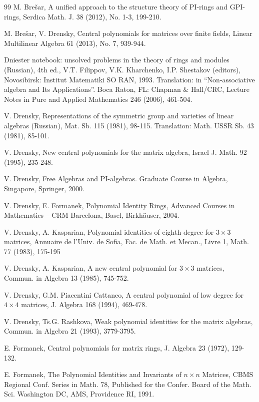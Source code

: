 \documentclass[12pt]{amsart}
\theoremstyle{definition}
\begin{document}
\begin{thebibliography}{99}
 M. Bre\v{s}ar,
A unified approach to the structure theory of PI-rings and GPI-rings,
Serdica Math. J. 38 (2012), No. 1-3, 199-210.

M. Bre\v{s}ar, V. Drensky,
Central polynomials for matrices over finite fields,
Linear Multilinear Algebra 61 (2013), No. 7, 939-944.

Dniester notebook: unsolved problems in the theory of rings and modules (Russian), 4th ed.,
V.T. Filippov, V.K. Kharchenko, I.P. Shestakov (editors), Novosibirsk: Institut Matematiki SO RAN, 1993.
Translation: in ``Non-associative algebra and Its Applications''. Boca Raton, FL: Chapman \& Hall/CRC, Lecture Notes in Pure and Applied Mathematics 246 (2006), 461-504.

V. Drensky,
Representations of the symmetric group and
varieties of linear algebras (Russian), Mat. Sb. 115 (1981), 98-115.
Translation: Math. USSR Sb. 43 (1981), 85-101.

V. Drensky,
New central polynomials for the matrix algebra,
Israel J. Math. 92 (1995), 235-248.

V. Drensky, Free Algebras and PI-algebras. Graduate Course in Algebra,
Singapore, Springer, 2000.

V. Drensky, E. Formanek,
Polynomial Identity Rings,
Advanced Courses in Mathematics -- CRM Barcelona, Basel, Birkh\"auser, 2004.

V. Drensky, A. Kasparian,
Polynomial identities of eighth degree  for $3 \times 3$ matrices,
Annuaire de l'Univ. de Sofia, Fac. de Math. et Mecan.,
Livre 1, Math. 77 (1983), 175-195

V. Drensky, A. Kasparian,
A new central polynomial for $3 \times 3$ matrices,
Commun. in Algebra 13 (1985), 745-752.

V. Drensky, G.M. Piacentini Cattaneo,
A central polynomial of low degree for $4 \times 4$ matrices,
J. Algebra 168 (1994), 469-478.

V. Drensky, Ts.G. Rashkova,
Weak polynomial identities for the matrix algebras,
Commun. in  Algebra 21 (1993), 3779-3795.

E. Formanek,
Central polynomials for matrix rings,
J. Algebra 23 (1972), 129-132.

E. Formanek,
The Polynomial Identities and Invariants of $n \times n$ Matrices,
CBMS Regional Conf. Series in Math. 78,
Published for the Confer. Board of the Math. Sci. Washington DC, AMS, Providence RI, 1991.


\end{thebibliography}
\end{document}

